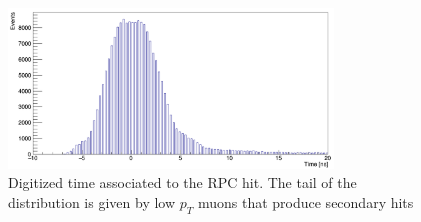 \begin{figure}[!h]
	\centering
	\includegraphics[width=0.77\textwidth]{Chapters/CH3/figures/time_BI}
	\caption{Digitized time associated to the RPC hit. The tail of the distribution is given by low 
		$p_T$ muons that produce secondary hits}
	\label{fig:time_BI}
\end{figure}


